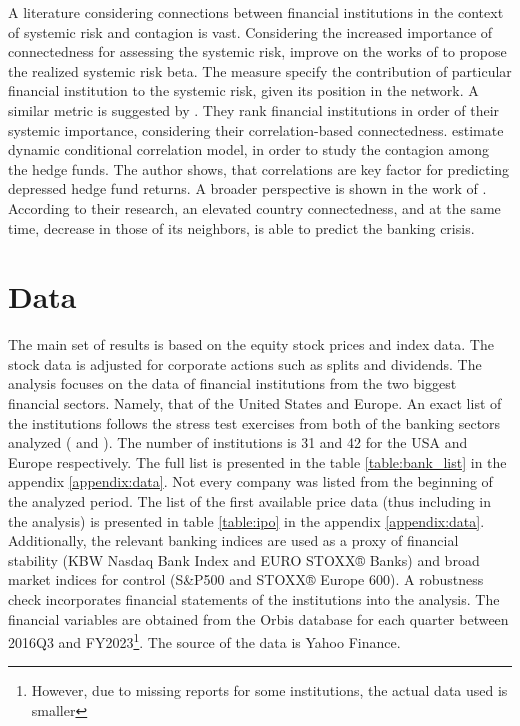 \documentclass[12pt]{article}
\begin{document}
A literature considering connections between financial institutions in the context of systemic risk and contagion is vast. Considering the increased importance of connectedness for assessing the systemic risk, \cite{hautsch14} improve on the works of \cite{adrian16} to propose the realized systemic risk beta. The measure specify the contribution of particular financial institution to the systemic risk, given its position in the network. A similar metric is suggested by \cite{dungey12}. They rank financial institutions in order of their systemic importance, considering their correlation-based connectedness. \cite{savona14} estimate dynamic conditional correlation model, in order to study the contagion among the hedge funds. The author shows, that correlations are key factor for predicting depressed hedge fund returns. A broader perspective is shown in the work of \cite{minoiu15}. According to their research, an elevated country connectedness, and at the same time, decrease in those of its neighbors, is able to predict the banking crisis.

\section{Data}\label{section:Data}

The main set of results is based on the equity stock prices and index data. The stock data is adjusted for corporate actions such as splits and dividends. The analysis focuses on the data of financial institutions from the two biggest financial sectors. Namely, that of the United States and Europe. An exact list of the institutions follows the stress test exercises from both of the banking sectors analyzed (\cite{eba2021} and \cite{fed21}). The number of institutions is 31 and 42 for the USA and Europe respectively. The full list is presented in the table \ref{table:bank_list} in the appendix \ref{appendix:data}. Not every company was listed from the beginning of the analyzed period. The list of the first available price data (thus including in the analysis) is presented in table \ref{table:ipo} in the appendix \ref{appendix:data}. Additionally, the relevant banking indices are used as a proxy of financial stability (KBW Nasdaq Bank Index and EURO STOXX® Banks) and broad market indices for control (S\&P500 and STOXX® Europe 600). A robustness check incorporates financial statements of the institutions into the analysis. The financial variables are obtained from the Orbis database for each quarter between 2016Q3 and FY2023\footnote{However, due to missing reports for some institutions, the actual data used is smaller}. The source of the data is Yahoo Finance. 
\end{document}
